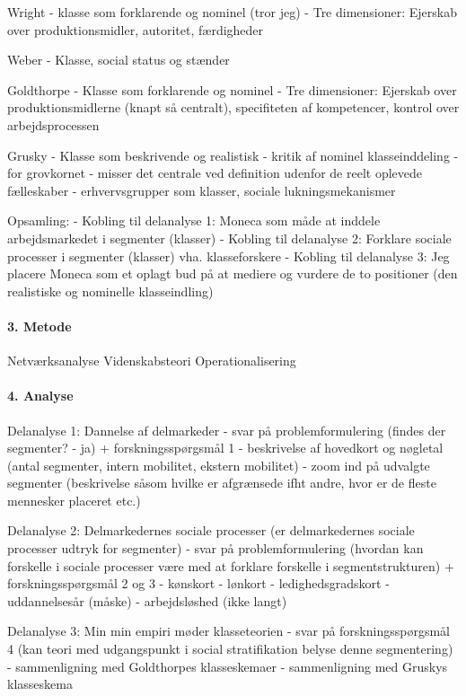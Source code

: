 	Wright
		- klasse som forklarende og nominel (tror jeg)
		- Tre dimensioner: Ejerskab over produktionsmidler, autoritet, færdigheder

	Weber
		- Klasse, social status og stænder

	Goldthorpe
		- Klasse som forklarende og nominel
		- Tre dimensioner: Ejerskab over produktionsmidlerne (knapt så centralt), specifiteten af kompetencer, kontrol over arbejdsprocessen 

	Grusky
		- Klasse som beskrivende og realistisk
		- kritik af nominel klasseinddeling
			- for grovkornet
			- misser det centrale ved definition udenfor de reelt oplevede fælleskaber
		- erhvervsgrupper som klasser, sociale lukningsmekanismer

	Opsamling: 
		- Kobling til delanalyse 1: Moneca som måde at inddele arbejdsmarkedet i segmenter (klasser)
		- Kobling til delanalyse 2: Forklare sociale processer i segmenter (klasser) vha. klasseforskere
		- Kobling til delanalyse 3: Jeg  placere Moneca som et oplagt bud på at mediere og vurdere de to positioner (den realistiske og nominelle klasseindling)


\paragraph{3. Metode}

	Netværksanalyse
	Videnskabsteori
	Operationalisering


\paragraph{4. Analyse}

	Delanalyse 1: Dannelse af delmarkeder
		- svar på problemformulering (findes der segmenter? - ja) + forskningsspørgsmål 1
		- beskrivelse af hovedkort og nøgletal (antal segmenter, intern mobilitet, ekstern mobilitet)
		- zoom ind på udvalgte segmenter (beskrivelse såsom hvilke er afgrænsede ifht andre, hvor er de fleste mennesker placeret etc.) 

	Delanalyse 2: Delmarkedernes sociale processer (er delmarkedernes sociale processer udtryk for segmenter)
		- svar på problemformulering (hvordan kan forskelle i sociale processer være med at forklare forskelle i segmentstrukturen) + forskningsspørgsmål 2 og 3
		- kønskort
		- lønkort
		- ledighedsgradskort
		- uddannelsesår (måske)
		- arbejdsløshed (ikke langt)

	Delanalyse 3: Min min empiri møder klasseteorien
		- svar på forskningsspørgsmål 4 (kan teori med udgangspunkt i social stratifikation belyse denne segmentering)
		- sammenligning med Goldthorpes klasseskemaer
		- sammenligning med Gruskys klasseskema

